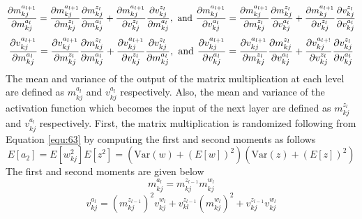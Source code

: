\documentclass[]{article}
\begin{document}
\begin{equation}
	\frac{\partial m_{kj}^{a_{l+1}}}{\partial m_{kj}^{a_l}} = \frac{\partial m_{kj}^{a_{l+1}}}{\partial m_{kj}^{z_l}} \frac{\partial m_{kj}^{z_l}}{\partial m_{kj}^{a_l}} + \frac{\partial m_{kj}^{a_{l+1}}}{\partial v_{kj}^{z_l}} \frac{\partial v_{kj}^{z_l}}{\partial m_{kj}^{a_l}}, \hspace{0.05in} \text{and} \hspace{0.05in} \frac{\partial m_{kj}^{a_{l+1}}}{\partial v_{kj}^{a_l}} = \frac{\partial m_{kj}^{a_{l+1}}}{\partial m_{kj}^{z_l}} \frac{\partial m_{kj}^{z_l}}{\partial v_{kj}^{a_l}} + \frac{\partial m_{kj}^{a_{l+1}}}{\partial v_{kj}^{z_l}} \frac{\partial v_{kj}^{z_l}}{\partial v_{kj}^{a_l}}
	\label{equ:68}
\end{equation}
\begin{equation}
	\frac{\partial v_{kj}^{a_{l+1}}}{\partial m_{kj}^{a_l}} = \frac{\partial v_{kj}^{a_{l+1}}}{\partial m_{kj}^{z_l}} \frac{\partial m_{kj}^{z_l}}{\partial m_{kj}^{a_l}} + \frac{\partial v_{kj}^{a_{l+1}}}{\partial v_{kj}^{z_l}} \frac{\partial v_{kj}^{z_l}}{\partial m_{kj}^{a_l}}, \hspace{0.05in} \text{and} \hspace{0.05in} \frac{\partial v_{kj}^{a_{l+1}}}{\partial v_{kj}^{a_l}} = \frac{\partial v_{kj}^{a_{l+1}}}{\partial m_{kj}^{z_l}} \frac{\partial m_{kj}^{z_l}}{\partial v_{kj}^{a_l}} + \frac{\partial v_{kj}^{a_{l+!}}}{\partial v_{kj}^{z_l}} \frac{\partial v_{kj}^{z_l}}{\partial v_{kj}^{a_l}}
	\label{equ:69}
\end{equation}
The mean and variance of the output of the matrix multiplication at each level are defined as $m_{kj}^{a_l}$ and $v_{kj}^{a_l}$ respectively. Also, the mean and variance of the activation function which becomes the input of the next layer are defined as $m_{kj}^{z_l}$ and $v_{kj}^{a_l}$ respectively. First, the matrix multiplication is randomized following from Equation \ref{equ:63} by computing the first and second moments as follows
\begin{equation}
	E[a_2] = E[w_{kj}^2]E[z^2] = (\text{Var}(w) + (E[w])^2)(\text{Var}(z) + (E[z])^2)
	\label{equ:70}
\end{equation}
The first and second moments are given below
\begin{equation}
	m_{kj}^{a_l} = m_{kj}^{z_{l-1}}m_{kj}^{w_l} 
	\label{equ:71}
\end{equation}
\begin{equation}
	v_{kj}^{a_l} = (m_{kj}^{z_{l-1}})^2v_{kj}^{w_l} + v_{kl}^{z_{l-1}}(m_{kj}^{w_l})^2 + v_{kj}^{z_{l-1}}v_{kj}^{w_l}
	\label{equ:72}
\end{equation}
\end{document}
